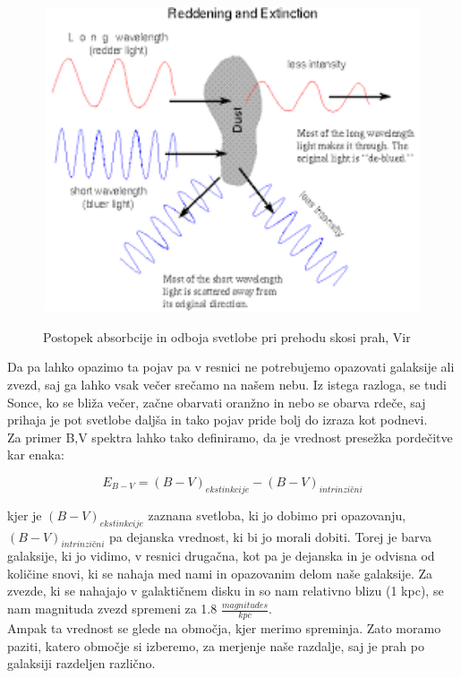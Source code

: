 \documentclass[12pt, a4paper]{article}
\begin{document}
\begin{figure}[H]
    \centering
    \includegraphics[width=12cm, height=9cm]{ex1.png}
    \label{fig:pordecitev}
    \caption{Postopek absorbcije in odboja svetlobe pri prehodu skosi prah, Vir \cite{pordecitev}}
\end{figure}
Da pa lahko opazimo ta pojav pa v resnici ne potrebujemo opazovati galaksije ali zvezd, saj ga lahko vsak večer srečamo na našem nebu. Iz istega razloga, se tudi Sonce, ko se bliža večer, začne obarvati oranžno in nebo se obarva rdeče, saj prihaja je pot svetlobe daljša in tako pojav pride bolj do izraza kot podnevi\cite{ekstinkcija2}.\\


Za primer B,V spektra lahko tako definiramo, da je vrednost presežka pordečitve kar enaka:

$$E_{B-V}=(B-V)_{ekstinkcije}-(B-V)_{intrinzični}$$

kjer je $(B-V)_{ekstinkcije}$ zaznana svetloba, ki jo dobimo pri opazovanju, $(B-V)_{intrinzični}$ pa dejanska vrednost, ki bi jo morali dobiti. Torej je barva galaksije, ki jo vidimo, v resnici drugačna, kot pa je dejanska in je odvisna od količine snovi, ki se nahaja med nami in opazovanim delom naše galaksije. Za zvezde, ki se nahajajo v galaktičnem disku in so nam relativno blizu (1 kpc), se nam magnituda zvezd spremeni za 1.8 $\frac{magnitudes}{kpc}$.\cite{pordecitev} \\


Ampak ta vrednost se glede na območja, kjer merimo spreminja. Zato moramo paziti, katero območje si izberemo, za merjenje naše razdalje, saj je prah po galaksiji razdeljen različno.
\end{document}
